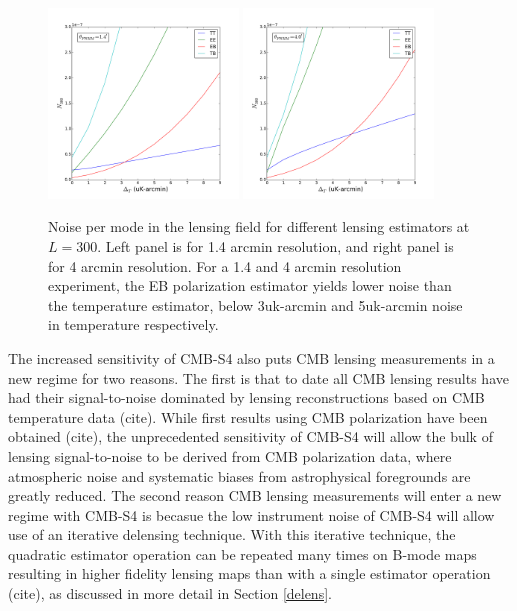\begin{figure}[h]
\includegraphics[width=0.45\textwidth]{CMBLensing/ell300_1_40.pdf}
\includegraphics[width=0.45\textwidth]{CMBLensing/ell300_4_00.pdf}
\caption{Noise per mode in the lensing field for different lensing estimators at $L = 300$.  Left panel is for 1.4 arcmin resolution, and right panel is for 4 arcmin resolution.  For a 1.4 and 4 arcmin resolution experiment, the EB polarization estimator yields lower noise than the temperature estimator, below 3uk-arcmin and 5uk-arcmin noise in temperature respectively.}
\end{figure}


The increased sensitivity of CMB-S4 also puts CMB lensing measurements in a new regime for two reasons.  The first is that to date all CMB lensing results have had their signal-to-noise dominated by lensing reconstructions based on CMB temperature data (cite).  While first results using CMB polarization have been obtained (cite), the unprecedented sensitivity of CMB-S4 will allow the bulk of lensing signal-to-noise to be derived from CMB polarization data, where atmospheric noise and systematic biases from astrophysical foregrounds are greatly reduced.  The second reason CMB lensing measurements will enter a new regime with CMB-S4 is becasue the low instrument noise of CMB-S4 will allow use of an iterative delensing technique.  With this iterative technique, the quadratic estimator operation can be repeated many times on B-mode maps resulting in higher fidelity lensing maps than with a single estimator operation (cite), as discussed in more detail in Section \ref{delens}.   





